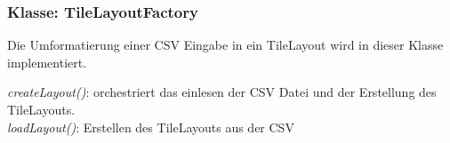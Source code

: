 \subsubsection{Klasse: TileLayoutFactory}
Die Umformatierung einer CSV Eingabe in ein TileLayout wird in dieser Klasse implementiert.

\textit{createLayout()}: orchestriert das einlesen der CSV Datei und der Erstellung des TileLayouts. \\
\textit{loadLayout()}: Erstellen des TileLayouts aus der CSV
